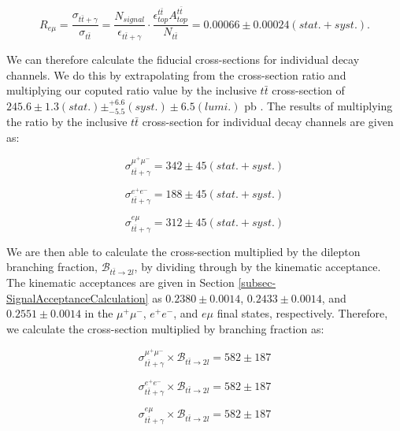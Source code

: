 \begin{equation}
	R_{e\mu} = \frac{\sigma_{t\bar{t}+\gamma}}{\sigma_{t\bar{t}}} = \frac{N_{signal}}{\epsilon_{t\bar{t}+\gamma}} \cdot \frac{\epsilon^{t\bar{t}}_{top} A^{t\bar{t}}_{top}}{N_{t\bar{t}}} = 0.00066 \pm 0.00024 (stat. + syst.).
\end{equation}


We can therefore calculate the fiducial cross-sections for individual decay channels. We do this by extrapolating from the cross-section ratio and multiplying our coputed ratio value by the inclusive $t\bar{t}$ cross-section of $245.6 \pm 1.3(stat.) \pm_{-5.5}^{+6.6}(syst.) \pm 6.5(lumi.)$ pb \cite{Khachatryan:2016mqs}. The results of multiplying the ratio by the inclusive $t\bar{t}$ cross-section for individual decay channels are given as:

\begin{equation}
	\sigma_{t\bar{t}+\gamma}^{\mu^+\mu^-} = 342 \pm 45 (stat. + syst.)
\end{equation}

\begin{equation}
	\sigma_{t\bar{t}+\gamma}^{e^+e^-} = 188 \pm 45 (stat. + syst.)
\end{equation}

\begin{equation}
	\sigma_{t\bar{t}+\gamma}^{e\mu} = 312 \pm 45 (stat. + syst.)
\end{equation}

We are then able to calculate the cross-section multiplied by the dilepton branching fraction, $\mathcal{B}_{t\bar{t}\to2l}$, by dividing through by the kinematic acceptance. The kinematic acceptances are given in Section \ref{subsec-SignalAcceptanceCalculation} as $0.2380 \pm 0.0014$, $0.2433 \pm 0.0014$, and $0.2551 ± 0.0014$ in the $\mu^+\mu^-$, $e^+e^-$, and $e\mu$ final states, respectively. Therefore, we calculate the cross-section multiplied by branching fraction as:

\begin{equation}
	\sigma_{t\bar{t}+\gamma}^{\mu^+\mu^-}\times \mathcal{B}_{t\bar{t}\to2l} = 582 \pm 187
\end{equation}

\begin{equation}
	\sigma_{t\bar{t}+\gamma}^{e^+e^-}\times \mathcal{B}_{t\bar{t}\to2l}  = 582 \pm 187
\end{equation}

\begin{equation}
	\sigma_{t\bar{t}+\gamma}^{e\mu}\times \mathcal{B}_{t\bar{t}\to2l}  = 582 \pm 187
\end{equation}

